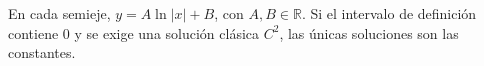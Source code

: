 En cada semieje, $y=A\ln|x|+B$, con $A,B\in\mathbb R$. Si el intervalo de definición contiene $0$ y se exige una solución clásica $C^2$, las únicas soluciones son las constantes.
